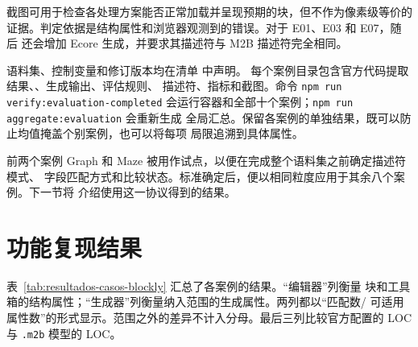 截图可用于检查各处理方案能否正常加载并呈现预期的块，但不作为像素级等价的
证据。判定依据是结构属性和浏览器观测到的错误。对于 E01、E03 和 E07，随后
还会增加 Ecore 生成，并要求其描述符与 M2B 描述符完全相同。

语料集、控制变量和修订版本均在清单
\allowbreak{} 中声明。
每个案例目录包含官方代码提取结果、、生成输出、评估规则、
描述符、指标和截图。命令 \texttt{npm run\allowbreak{} verify:\allowbreak{}evaluation-\allowbreak{}completed}
会运行容器和全部十个案例；\texttt{npm run\allowbreak{} aggregate:\allowbreak{}evaluation} 会重新生成
全局汇总。保留各案例的单独结果，既可以防止均值掩盖个别案例，也可以将每项
局限追溯到具体属性。

前两个案例 Graph 和 Maze 被用作试点，以便在完成整个语料集之前确定描述符模式、
字段匹配方式和比较状态。标准确定后，便以相同粒度应用于其余八个案例。下一节将
介绍使用这一协议得到的结果。

\section{功能复现结果}
\label{sec:resultados-reproduccion}

表~\ref{tab:resultados-casos-blockly} 汇总了各案例的结果。“编辑器”列衡量
块和工具箱的结构属性；“生成器”列衡量纳入范围的生成属性。两列都以“匹配数/
可适用属性数”的形式显示。范围之外的差异不计入分母。最后三列比较官方配置的
LOC 与 \texttt{.m2b} 模型的 LOC。

